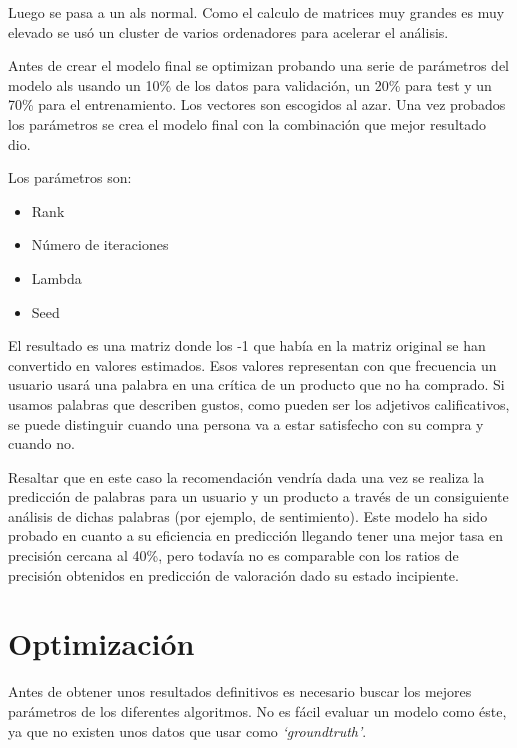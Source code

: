 \documentclass[withindex, glossary]{cam-thesis}
\begin{document}
Luego se pasa a un \acrshort{als} normal. Como el calculo de matrices muy grandes es muy elevado se usó un cluster de varios ordenadores para acelerar el análisis.

Antes de crear el modelo final se optimizan probando una serie de parámetros del modelo \acrshort{als} usando un 10\% de los datos para validación, un 20\% para test y un 70\% para el entrenamiento. Los vectores son escogidos al azar. Una vez probados los parámetros se crea el modelo final con la combinación que mejor resultado dio.

Los parámetros son:

\begin{multicols}{2}
    \begin{itemize}
        \item Rank
        \item Número de iteraciones
        \item Lambda
        \item Seed
    \end{itemize}
\end{multicols}

El resultado es una matriz donde los -1 que había en la matriz original se han convertido en valores estimados. Esos valores representan con que frecuencia un usuario usará una palabra en una crítica de un producto que no ha comprado. Si usamos palabras que describen gustos, como pueden ser los adjetivos calificativos, se puede distinguir cuando una persona va a estar satisfecho con su compra y cuando no.

Resaltar que en este caso la recomendación vendría dada una vez se realiza la predicción de palabras para un usuario y un producto a través de un consiguiente análisis de dichas palabras (por ejemplo, de sentimiento). Este modelo ha sido probado en cuanto a su eficiencia en predicción\cite{emodelo} llegando tener una mejor tasa en precisión cercana al 40\%, pero todavía no es comparable con los ratios de precisión obtenidos en predicción de valoración dado su estado incipiente.

\chapter{Optimización}\label{chap:opt}
Antes de obtener unos resultados definitivos es necesario buscar los mejores parámetros de los diferentes algoritmos. No es fácil evaluar un modelo como éste, ya que no existen unos datos que usar como \textit{`\gls{groundtruth}'}.
\end{document}
